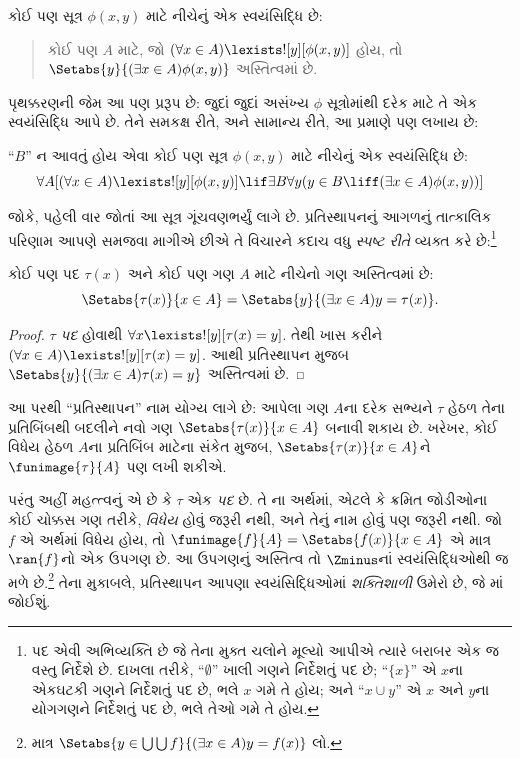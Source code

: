 \begin{axiom}[પ્રતિસ્થાપનનું પ્રરૂપ]
કોઈ પણ સૂત્ર $\phi(x, y)$ માટે નીચેનું એક સ્વયંસિદ્ધિ છે:
\begin{quote}
	કોઈ પણ $A$ માટે, જો $(\forall x \in A)\lexists![y][\phi(x,y)]$ હોય, તો
	$\Setabs{y}{(\exists x \in A)\phi(x,y)}$ અસ્તિત્વમાં છે.
\end{quote}
\end{axiom}
\noindent
પૃથક્કરણની જેમ આ પણ પ્રરૂપ છે: જુદાં જુદાં અસંખ્ય $\phi$ સૂત્રોમાંથી
દરેક માટે તે એક સ્વયંસિદ્ધિ આપે છે. તેને સમકક્ષ રીતે, અને સામાન્ય રીતે,
આ પ્રમાણે પણ લખાય છે:

\begin{defish}
``$B$'' ન આવતું હોય એવા કોઈ પણ સૂત્ર $\phi(x,y)$ માટે નીચેનું એક સ્વયંસિદ્ધિ છે:
\[
\forall A[(\forall x \in A)\lexists![y][\phi(x,y)] \lif \exists B\forall y (y \in B \liff (\exists x \in A)\phi(x,y))]
\]
\end{defish}

જોકે, પહેલી વાર જોતાં આ સૂત્ર ગૂંચવણભર્યું લાગે છે. પ્રતિસ્થાપનનું
આગળનું તાત્કાલિક પરિણામ આપણે સમજવા માગીએ છીએ તે વિચારને કદાચ વધુ
\emph{સ્પષ્ટ રીતે} વ્યક્ત કરે છે:\footnote{પદ એવી અભિવ્યક્તિ છે
જે તેના મુક્ત ચલોને મૂલ્યો આપીએ ત્યારે બરાબર એક જ વસ્તુ નિર્દેશે છે.
દાખલા તરીકે, ``$\emptyset$'' ખાલી ગણને નિર્દેશતું પદ છે;
``$\{x\}$'' એ $x$ના એકઘટકી ગણને નિર્દેશતું પદ છે, ભલે $x$ ગમે તે હોય;
અને ``$x \cup y$'' એ $x$ અને $y$ના યોગગણને નિર્દેશતું પદ છે,
ભલે તેઓ ગમે તે હોય.}

\begin{cor}
કોઈ પણ પદ $\tau(x)$ અને કોઈ પણ ગણ $A$ માટે નીચેનો ગણ અસ્તિત્વમાં છે:
\[
	\Setabs{\tau(x)}{x \in A} = \Setabs{y}{(\exists x \in A)y = \tau(x)}.
\]
\end{cor}

\begin{proof}
$\tau$ \emph{પદ} હોવાથી $\forall x \lexists![y][\tau(x) = y]$.
તેથી ખાસ કરીને $(\forall x \in A)\lexists![y][\tau(x) = y]$.
આથી પ્રતિસ્થાપન મુજબ
$\Setabs{y}{(\exists x \in A)\tau(x) = y}$ અસ્તિત્વમાં છે.
\end{proof}
\noindent
આ પરથી ``પ્રતિસ્થાપન'' નામ યોગ્ય લાગે છે: આપેલા ગણ $A$ના દરેક સભ્યને
$\tau$ હેઠળ તેના પ્રતિબિંબથી બદલીને નવો ગણ
$\Setabs{\tau(x)}{x \in A}$ બનાવી શકાય છે. ખરેખર, કોઈ વિધેય
હેઠળ $A$ના પ્રતિબિંબ માટેના સંકેત મુજબ, $\Setabs{\tau(x)}{x \in A}$ને
$\funimage{\tau}{A}$ પણ લખી શકીએ.

પરંતુ અહીં મહત્ત્વનું એ છે કે $\tau$ એક \emph{પદ} છે. તે
ના અર્થમાં, એટલે કે ક્રમિત જોડીઓના
કોઈ ચોક્કસ ગણ તરીકે, \emph{વિધેય} હોવું જરૂરી નથી, અને તેનું નામ
હોવું પણ જરૂરી નથી. જો $f$ એ અર્થમાં વિધેય હોય, તો
$\funimage{f}{A} = \Setabs{f(x)}{x \in
A}$ એ માત્ર $\ran{f}$નો એક ઉપગણ છે. આ ઉપગણનું અસ્તિત્વ
તો $\Zminus$નાં સ્વયંસિદ્ધિઓથી જ મળે છે.\footnote{માત્ર
$\Setabs{y \in \bigcup \bigcup f}{(\exists x \in A)y =
f(x)}$ લો.} તેના મુકાબલે, પ્રતિસ્થાપન આપણા સ્વયંસિદ્ધિઓમાં
\emph{શક્તિશાળી} ઉમેરો છે, જે
માં જોઈશું.
\endgroup

